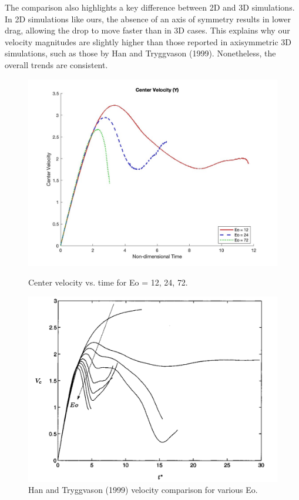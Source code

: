 \documentclass[12pt]{article}
\begin{document}
The comparison also highlights a key difference between 2D and 3D simulations. In 2D simulations like ours, the absence of an axis of symmetry results in lower drag, allowing the drop to move faster than in 3D cases. This explains why our velocity magnitudes are slightly higher than those reported in axisymmetric 3D simulations, such as those by Han and Tryggvason (1999). Nonetheless, the overall trends are consistent.

\begin{figure}[H]
    \centering
    \begin{minipage}{0.45\textwidth}
        \centering
        \includegraphics[width=\textwidth]{figures/velocity_profile_compare.jpg}
        \caption{Center velocity vs. time for Eo = 12, 24, 72.}
        \label{fig:velocity_comparison}
    \end{minipage}
    \hspace{0.05\textwidth}
    \begin{minipage}{0.45\textwidth}
        \centering
        \includegraphics[width=\textwidth]{figures/Trygg_allEo_velo.jpeg}
        \caption{Han and Tryggvason (1999) velocity comparison for various Eo.}
        \label{fig:trygg_comparison}
    \end{minipage}
\end{figure}
\end{document}
